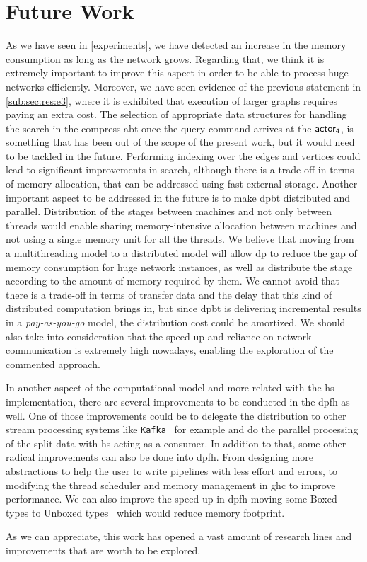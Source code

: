 \section{Future Work}
As we have seen in \autoref{experiments}, we have detected an increase in the memory consumption as long as the network grows. 
Regarding that, we think it is extremely important to improve this aspect in order to be able to process huge networks efficiently. 
Moreover, we have seen evidence of the previous statement in \autoref{sub:sec:res:e3}, where it is exhibited that execution of larger graphs requires paying an extra cost.
The selection of appropriate data structures for handling the search in the compress \acrlong{abt} once the query command arrives at the $\mathsf{actor_4}$, is something that has been out of the scope of the present work, but it would need to be tackled in the future.
Performing indexing over the edges and vertices could lead to significant improvements in search, although there is a trade-off in terms of memory allocation, that can be addressed using fast external storage.
Another important aspect to be addressed in the future is to make \acrlong{dpbt} distributed and parallel. Distribution of the stages between machines and not only between threads would enable sharing memory-intensive allocation between machines and not using a single memory unit for all the threads.
We believe that moving from a multithreading model to a distributed model will allow \acrlong{dp} to reduce the gap of memory consumption for huge network instances, as well as distribute the stage according to the amount of memory required by them. 
We cannot avoid that there is a trade-off in terms of transfer data and the delay that this kind of distributed computation brings in, but since \acrlong{dpbt} is delivering incremental results in a \emph{pay-as-you-go} model, the distribution cost could be amortized. 
We should also take into consideration that the speed-up and reliance on network communication is extremely high nowadays, enabling the exploration of the commented approach.

In another aspect of the computational model and more related with the \acrlong{hs} implementation, there are several improvements to be conducted in the \acrlong{dpfh} as well. 
One of those improvements could be to delegate the distribution to other stream processing systems like \texttt{Kafka}~\cite{kafka} for example and do the parallel processing of the split data with \acrlong{hs} acting as a consumer.
In addition to that, some other radical improvements can also be done into \acrlong{dpfh}. From designing more abstractions to help the user to write pipelines with less effort and errors, to modifying the thread scheduler and memory management in \acrshort{ghc} to improve performance. 
We can also improve the speed-up in \acrlong{dpfh} moving some Boxed types to Unboxed types~\cite{hs-unbox} which would reduce memory footprint.

As we can appreciate, this work has opened a vast amount of research lines and improvements that are worth to be explored.

